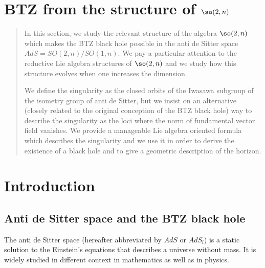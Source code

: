 
\section{BTZ from the structure of \texorpdfstring{$ \so(2,n)$}{so(2,n)}}

\begin{abstract}
	In this section, we study the relevant structure of the algebra $\so(2,n)$ which makes the BTZ black hole possible in the anti de Sitter space $AdS=SO(2,n)/SO(1,n)$. We pay a particular attention to the reductive Lie algebra structures of $\so(2,n)$ and we study how this structure evolves when one increases the dimension.

	We define the singularity as the closed orbits of the Iwasawa subgroup of the isometry group of anti de Sitter, but we insist on an alternative (closely related to the original conception of the BTZ black hole) way to describe the singularity as the loci where the norm of fundamental vector field vanishes. We provide a manageable Lie algebra oriented formula which describes the singularity and we use it in order to derive the existence of a black hole and to give a geometric description of the horizon.

\end{abstract}


\section{Introduction}
\label{LONGSecSumStructExist}

\subsection{Anti de Sitter space and the BTZ black hole}

The anti de Sitter space (hereafter abbreviated by $AdS$ or $AdS_l$) is a static solution to the Einstein's equations that describes a universe without mass. It is widely studied in different context in mathematics as well as in physics.

